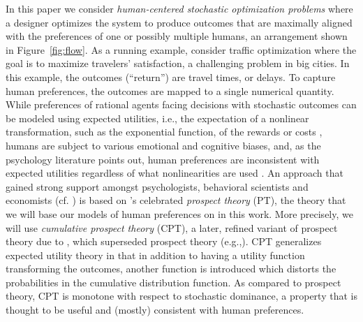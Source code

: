 In this paper we consider \emph{human-centered stochastic optimization problems}
where a designer optimizes the system 
to produce outcomes that are maximally aligned with the preferences of 
one or possibly multiple humans, an arrangement shown in Figure~\ref{fig:flow}.
As a running example, consider traffic optimization where the goal is to maximize
travelers' satisfaction, a challenging problem 
in big cities.
In this example, the outcomes (``return'') are travel times, or delays. 
To capture human preferences, the outcomes are mapped to a single numerical quantity.
While preferences of rational agents facing decisions with stochastic outcomes can be modeled using expected utilities,
i.e., the expectation of a nonlinear transformation, such as the exponential function, of the rewards or costs
\cite{NeuMo44,fishburn1970expectedutility}, 
	humans are subject to various emotional and cognitive biases,
	and, as the psychology literature points out, human preferences 
	are inconsistent with expected utilities regardless of what nonlinearities are used
	 \cite{allais53,ellsberg61,kahneman1979prospect}.
An approach that gained 
	strong support amongst psychologists, behavioral scientists and economists (cf. \cite{starmer2000developments,quiggin2012generalized})
	is based on \cite{kahneman1979prospect}'s celebrated \emph{prospect theory} (PT),
	the theory that we will base our models of human preferences on
	 in this work.
More precisely, we will use \emph{cumulative prospect theory} (CPT),
 	a later, refined variant of prospect theory due to \cite{tversky1992advances}, 
	which superseded prospect theory (e.g.,\cite{Barberis:2012vs}).
CPT generalizes expected utility theory in that in addition to having a utility function transforming
	the outcomes, another function is introduced which distorts the probabilities in the cumulative distribution function.
As compared to prospect theory, CPT is monotone with respect to stochastic dominance, a property
	that is thought to be useful and (mostly) consistent with human preferences.
	
